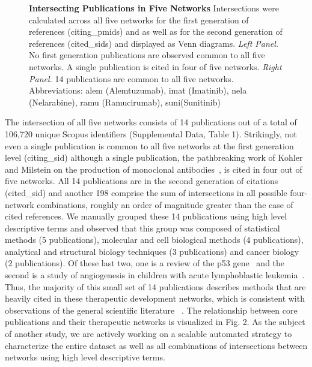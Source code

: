 \documentclass[10pt,letterpaper]{article}
\begin{document}
\begin{figure}[!h]
\begin{adjustwidth}{-0.5in}{0in}
{\begin{subfigure}{.5\textwidth}
  \label{fig:sub2}
\end{subfigure}
}
\caption{{\bf Intersecting Publications in Five Networks} Intersections were calculated across all five networks for the first generation of references (citing\_pmids) and 
as well as for the second generation of references (cited\_sids) and displayed as Venn diagrams.  \emph{Left Panel.} No first generation publications are observed common to all five networks. A single publication is cited in four of five networks. \emph{Right Panel.} 14  publications are common to all five networks. Abbreviations: alem (Alemtuzumab), imat (Imatinib), nela (Nelarabine), ramu (Ramucirumab), suni(Sunitinib)}
\label{fig: test}
\end{adjustwidth}
\end{figure}


The intersection of all five networks consists of 14 publications out of a total of 106,720 unique Scopus identifiers (Supplemental Data, Table 1). Strikingly, not even a single publication is common to all five networks at the first generation level (citing\_sid) although a single publication, the pathbreaking work of Kohler and Milstein on the production of monoclonal antibodies~\cite{bibKohler}, is cited in four out of five networks. All 14 publications are in the second generation of citations (cited\_sid) and another 198 comprise the sum of intersections in all possible four-network combinations, roughly an order of magnitude greater than the case of cited references. We manually grouped these 14 publications using high level descriptive terms and observed that this group was composed of  statistical methods (5 publications), molecular and cell biological methods (4 publications), analytical and structural biology techniques (3 publications) and cancer biology (2 publications). Of these last two, one is a review of the p53 gene~\cite{bibLevine} and the second is a study of angiogenesis in children with acute lymphoblastic leukemia~\cite{bibFolkman}. Thus, the majority of this small set of 14 publications describes methods that are heavily cited in these therapeutic development networks, which is consistent with observations of the general scientific literature ~\cite{bibVanNoorden}. The relationship between core publications and their therapeutic networks is visualized in Fig. 2. As the subject of another study, we are actively working on a scalable automated strategy to characterize the entire dataset as well as all combinations of intersections between networks using high level descriptive terms.  
\end{document}
